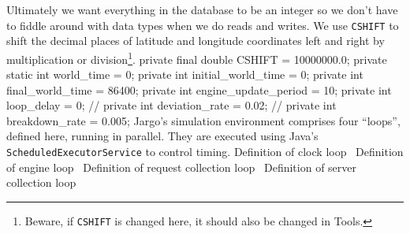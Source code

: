 \documentclass{article}
\newcommand{\hi}[1]{\noindent {\bf #1}}     %
\def\nwendcode{\endtrivlist \endgroup}      %
\let\nwdocspar=\par
\begin{document}
Ultimately we want everything in the database to be an integer so we don't have
to fiddle around with data types when we do reads and writes. We use {\tt{}\protect{}CSHIFT}
to shift the decimal places of latitude and longitude coordinates left and
right by multiplication or division\footnote{Beware, if {\tt{}\protect{}CSHIFT} is changed
here, it should also be changed in Tools.}.
\nwenddocs{}\endmoddef{}
private final double CSHIFT = 10000000.0;
private static int world_time = 0;
private int initial_world_time = 0;
private int final_world_time = 86400;
private int engine_update_period = 10;
private int loop_delay = 0;
// private int deviation_rate = 0.02;
// private int breakdown_rate = 0.005;
\eatline
{}\nwendcode{}\hi{Loops.} Jargo's simulation environment comprises four ``loops'', defined
here, running in parallel. They are executed using Java's
{\tt{}ScheduledExecutorService} to control timing.
\nwenddocs{}\endmoddef{}
\LA{}Definition of clock loop~{\nwtagstyle{}}\RA{}
\LA{}Definition of engine loop~{\nwtagstyle{}}\RA{}
\LA{}Definition of request collection loop~{\nwtagstyle{}}\RA{}
\LA{}Definition of server collection loop~{\nwtagstyle{}}\RA{}
\nwendcode{}\nwdocspar
\end{document}
